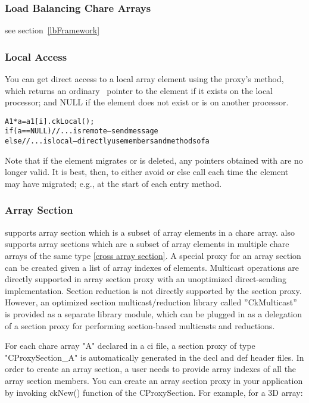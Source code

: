 \subsubsection{Load Balancing Chare Arrays}

see section~\ref{lbFramework}


\subsubsection{Local Access}

\experimental{}
\label{ckLocal for arrays}
You can get direct access to a local array element using the
proxy's  method, which returns an ordinary \CC\ pointer
to the element if it exists on the local processor; and NULL if
the element does not exist or is on another processor.

\begin{alltt}
A1 *a=a1[i].ckLocal();
if (a==NULL) //...is remote-- send message
else //...is local-- directly use members and methods of a
\end{alltt}

Note that if the element migrates or is deleted, any pointers 
obtained with  are no longer valid.  It is best,
then, to either avoid  or else call  
each time the element may have migrated; e.g., at the start 
of each entry method.


\subsubsection{Array Section}

\experimental{}
\label{array section}

\charmpp{} supports array section which is a subset of array 
elements in a chare array. \charmpp{} also supports array sections
which are a subset of array elements in multiple chare arrays of the
same type \ref{cross array section}.
A special proxy for an array section can be created given a list of array
indexes of elements.
Multicast operations are directly supported in array section proxy with
an unoptimized direct-sending implementation.
Section reduction is not directly supported by the section proxy. 
However, an optimized section multicast/reduction 
library called ''CkMulticast'' is provided as a separate library module,
which can be plugged in as a delegation of a section proxy for performing
section-based multicasts and reductions. 

For each chare array "A" declared in a ci file, a section proxy 
of type "CProxySection\_A" is automatically generated in the decl and def 
header files. 
In order to create an array section, a user needs to provide array indexes 
of all the array section members.
You can create an array section proxy in your application by 
invoking ckNew() function of the CProxySection.
For example, for a 3D array:


